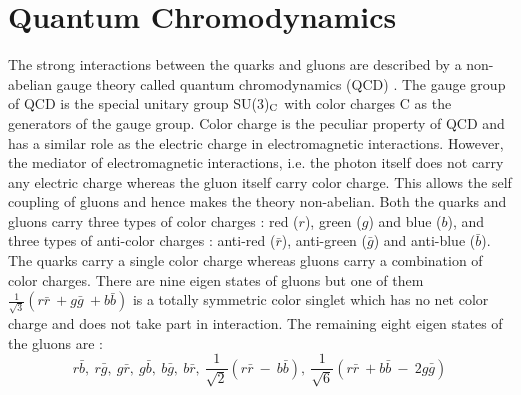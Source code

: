 \section{Quantum Chromodynamics}
The strong interactions between the quarks and gluons are described by a non-abelian gauge theory called quantum chromodynamics (QCD) \cite{Ellis:1991qj, Halzen:1984mc}. The gauge group of QCD is the special unitary group SU(3)$_{\rm C}$ with color charges C as the generators of the gauge group. Color charge is the peculiar property of QCD and has a similar role as the electric charge in electromagnetic interactions. However, the mediator of electromagnetic interactions, i.e. the photon itself does not carry any electric charge whereas the gluon itself carry color charge. This allows the self coupling of gluons and hence makes the theory non-abelian. Both the quarks and gluons carry three types of color charges : red ($r$), green ($g$) and blue ($b$), and three types of anti-color charges : anti-red ($\bar{r}$), anti-green ($\bar{g}$) and anti-blue ($\bar{b}$). The quarks carry a single color charge whereas gluons carry a combination of color charges. There are nine eigen states of gluons but one of them $\frac{1}{\sqrt{3}}(r\bar{r}~\plus g\bar{g}~\plus b\bar{b})$ is a totally symmetric color singlet which has no net color charge and does not take part in interaction. The remaining eight eigen states of the gluons are :
\begin{equation}
r\bar{b},~r\bar{g},~g\bar{r},~g\bar{b},~b\bar{g},~b\bar{r},~\frac{1}{\sqrt{2}}(r\bar{r}~-~b\bar{b}),~\frac{1}{\sqrt{6}}(r\bar{r}~\plus b\bar{b}~-~2g\bar{g}) 
\end{equation}

